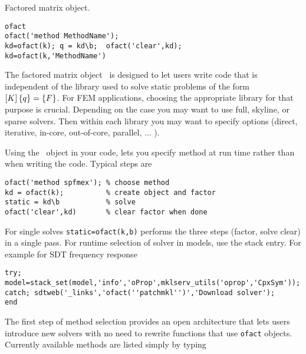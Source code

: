 

 Factored matrix object.


\begin{verbatim}
ofact
ofact('method MethodName');
kd=ofact(k); q = kd\b;  ofact('clear',kd);
kd=ofact(k,'MethodName')
\end{verbatim}


The factored matrix object \ofact\ is designed to let users write code that is independent of the library used to solve static problems of
the form $\left[K\right]\left\{q\right\}=\left\{F\right\}$.  For FEM applications, choosing the appropriate library for that purpose is crucial. Depending on the case
you may want to use full, skyline, or sparse solvers. Then within each library you may want to specify options (direct, iterative, in-core, out-of-core, parallel, ... ).

Using the \ofact\ object in your code, lets you specify method at run time rather than when writing the code. Typical steps are

\begin{verbatim}
ofact('method spfmex'); % choose method
kd = ofact(k);          % create object and factor
static = kd\b           % solve
ofact('clear',kd)       % clear factor when done
\end{verbatim}

For single solves {\tt static=ofact(k,b)} performs the three steps (factor, solve clear) in a single pass. For runtime selection of solver in models, use the  stack entry. For example for SDT frequency response

\begin{verbatim}
try; model=stack_set(model,'info','oProp',mklserv_utils('oprop','CpxSym'));
catch; sdtweb('_links','ofact(''patchmkl'')','Download solver');
end
\end{verbatim}


The first step of method selection provides an open architecture that lets users introduce new solvers with no need to rewrite functions that use {\tt ofact} objects. Currently available methods are listed simply by typing 

